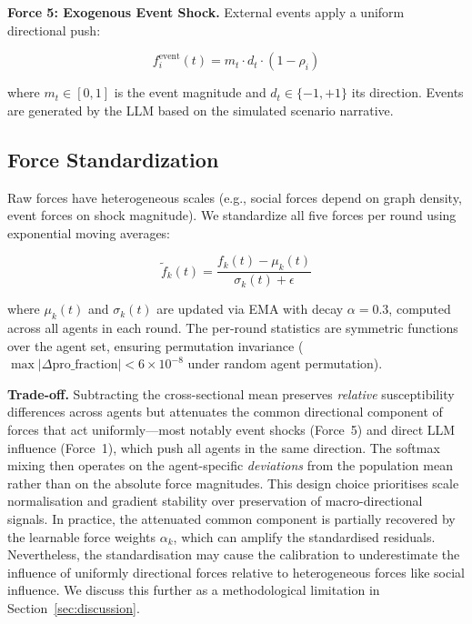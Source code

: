 \documentclass[12pt]{article}
\begin{document}
\textbf{Force 5: Exogenous Event Shock.} External events apply a uniform directional push:

\begin{equation}\label{eq:5}
f_i^{\text{event}}(t) = m_t \cdot d_t \cdot (1 - \rho_i)
\end{equation}

where $m_t \in [0, 1]$ is the event magnitude and $d_t \in \{-1, +1\}$ its direction. Events are generated by the LLM based on the simulated scenario narrative.

\subsection{Force Standardization}

Raw forces have heterogeneous scales (e.g., social forces depend on graph density, event forces on shock magnitude). We standardize all five forces per round using exponential moving averages:

\begin{equation}\label{eq:6}
\tilde{f}_k(t) = \frac{f_k(t) - \mu_k(t)}{\sigma_k(t) + \epsilon}
\end{equation}

where $\mu_k(t)$ and $\sigma_k(t)$ are updated via EMA with decay $\alpha = 0.3$, computed across all agents in each round. The per-round statistics are symmetric functions over the agent set, ensuring permutation invariance ($\max |\Delta\text{pro\_fraction}| < 6 \times 10^{-8}$ under random agent permutation).

\textbf{Trade-off.} Subtracting the cross-sectional mean preserves \emph{relative} susceptibility differences across agents but attenuates the common directional component of forces that act uniformly---most notably event shocks (Force~5) and direct LLM influence (Force~1), which push all agents in the same direction. The softmax mixing then operates on the agent-specific \emph{deviations} from the population mean rather than on the absolute force magnitudes. This design choice prioritises scale normalisation and gradient stability over preservation of macro-directional signals. In practice, the attenuated common component is partially recovered by the learnable force weights $\alpha_k$, which can amplify the standardised residuals. Nevertheless, the standardisation may cause the calibration to underestimate the influence of uniformly directional forces relative to heterogeneous forces like social influence. We discuss this further as a methodological limitation in Section~\ref{sec:discussion}.
\end{document}
